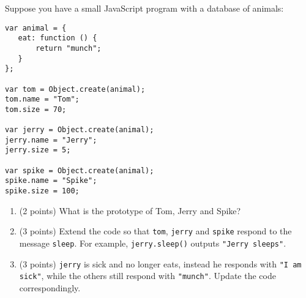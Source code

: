 \noindent
Suppose you have a small JavaScript program with a database of animals:

\begin{verbatim}
var animal = {
   eat: function () {
       return "munch";
   }
};

var tom = Object.create(animal);
tom.name = "Tom";
tom.size = 70;

var jerry = Object.create(animal);
jerry.name = "Jerry";
jerry.size = 5;

var spike = Object.create(animal);
spike.name = "Spike";
spike.size = 100;
\end{verbatim}

\begin{enumerate}
\item (2 points) What is the prototype of Tom, Jerry and Spike?
\vspace{4cm}

\item (3 points) Extend the code so that \texttt{tom}, \texttt{jerry} and \texttt{spike} respond to the message \texttt{sleep}. For example, \texttt{jerry.sleep()} outputs \texttt{"Jerry sleeps"}.
\vspace{5cm}

\item (3 points) \texttt{jerry} is sick and no longer eats, instead he responds with \texttt{"I am sick"}, while the others still respond with \texttt{"munch"}. Update the code correspondingly.
\end{enumerate}

